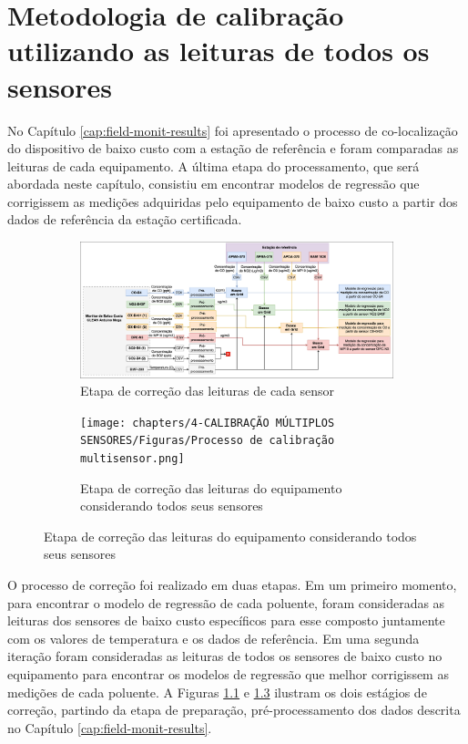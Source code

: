 
\chapter{Metodologia de calibração utilizando as leituras de todos os sensores}\label{cap:calib-methodology}

No Capítulo \ref{cap:field-monit-results} foi apresentado o processo de co-localização do dispositivo de baixo custo com a estação de referência e foram comparadas as leituras de cada equipamento. A última etapa do processamento, que será abordada neste capítulo, consistiu em encontrar modelos de regressão que corrigissem as medições adquiridas pelo equipamento de baixo custo a partir dos dados de referência da estação certificada. 

\begin{figure}[h!]
    \centering
    \caption{Fluxogramas do processo de correção das leituras do equipamento de baixo custo}
    \begin{subfigure}{0.9\textwidth}
        \includegraphics[width=\textwidth]{chapters/4-CALIBRAÇÃO MÚLTIPLOS SENSORES/Figuras/Processo de calibração unisensor.png}
        \caption{Etapa de correção das leituras de cada sensor}
        \label{fig:calibration-unisensor}
    \end{subfigure}
    \begin{subfigure}{0.9\textwidth}
        \texttt{[image: chapters/4-CALIBRAÇÃO MÚLTIPLOS SENSORES/Figuras/Processo de calibração multisensor.png]}
        \caption{Etapa de correção das leituras do equipamento considerando todos seus sensores}
        \label{fig:calibration-multisensor}
    \end{subfigure}
\end{figure}

O processo de correção foi realizado em duas etapas. Em um primeiro momento, para encontrar o modelo de regressão de cada poluente, foram consideradas as leituras dos sensores de baixo custo específicos para esse composto juntamente com os valores de temperatura e os dados de referência. Em uma segunda iteração foram consideradas as leituras de todos os sensores de baixo custo no equipamento para encontrar os modelos de regressão que melhor corrigissem as medições de cada poluente. A Figuras \ref{fig:calibration-unisensor} e \ref{fig:calibration-multisensor} ilustram os dois estágios de correção, partindo da etapa de preparação, pré-processamento dos dados descrita no Capítulo \ref{cap:field-monit-results}.

